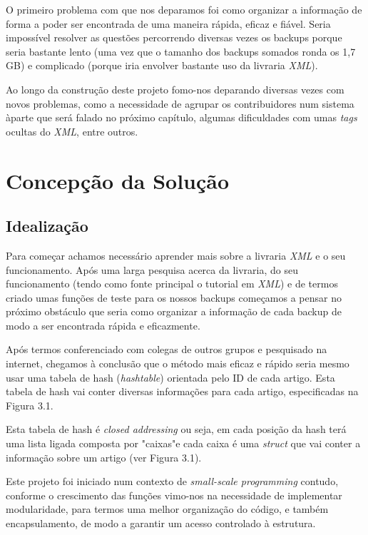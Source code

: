 \documentclass[a4paper,12pt]{report}
\begin{document}
O primeiro problema com que nos deparamos foi como organizar a informação de forma a poder ser encontrada de uma maneira rápida, eficaz e fiável. Seria impossível resolver as questões percorrendo diversas vezes os backups porque seria bastante lento (uma vez que o tamanho dos backups somados ronda os 1,7 GB) e complicado (porque iria envolver bastante uso da livraria {\sl XML}).

Ao longo da construção deste projeto fomo-nos deparando diversas vezes com novos problemas, como a necessidade de agrupar os contribuidores num sistema àparte que será falado no próximo capítulo, algumas dificuldades com umas {\sl tags} ocultas do {\sl XML}, entre outros.



\chapter{Concepção da Solução}


\section{Idealização}
Para começar achamos necessário aprender mais sobre a livraria {\sl XML} e o seu funcionamento. Após uma larga pesquisa acerca da livraria, do seu funcionamento (tendo como fonte principal o tutorial em {\sl XML}) e de termos criado umas funções de teste para os nossos backups começamos a pensar no próximo obstáculo que seria como organizar a informação de cada backup de modo a ser encontrada rápida e eficazmente.

Após termos conferenciado com colegas de outros grupos e pesquisado na internet, chegamos à conclusão que o método mais eficaz e rápido seria mesmo usar uma tabela de hash ({\sl hashtable}) orientada pelo ID de cada artigo. Esta tabela de hash vai conter diversas informações para cada artigo, especificadas na Figura 3.1.

Esta tabela de hash é {\sl closed addressing} ou seja, em cada posição da hash terá uma lista ligada composta por "caixas"\space e cada caixa é uma {\sl struct} que vai conter a informação sobre um artigo (ver Figura 3.1).

Este projeto foi iniciado num contexto de {\sl small-scale programming} contudo, conforme o crescimento das funções vimo-nos na necessidade de implementar modularidade, para termos uma melhor organização do código, e também encapsulamento, de modo a garantir um acesso controlado à estrutura.
\end{document}
